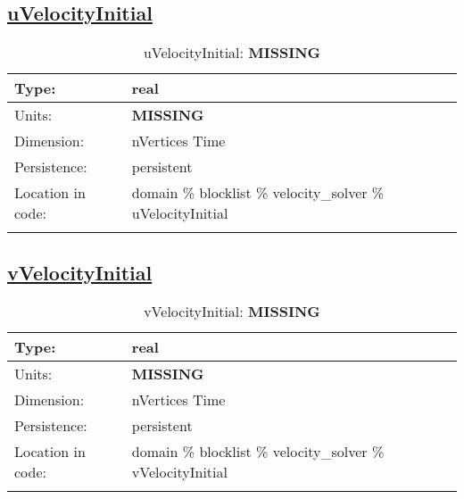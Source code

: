 \subsection[uVelocityInitial]{\hyperref[sec:var_tab_velocity_solver]{uVelocityInitial}}
\label{subsec:var_sec_velocity_solver_uVelocityInitial}
\begin{center}
\begin{longtable}{| p{2.0in} | p{4.0in} |}
        \hline 
        Type: & real \\
        \hline 
        Units: & {\bf \color{red} MISSING} \\
        \hline 
        Dimension: & nVertices Time \\
        \hline 
        Persistence: & persistent \\
        \hline 
         Location in code: & domain \% blocklist \% velocity\_solver \% uVelocityInitial \\
         \hline 
    \caption{uVelocityInitial: {\bf \color{red} MISSING}}
\end{longtable}
\end{center}
\subsection[vVelocityInitial]{\hyperref[sec:var_tab_velocity_solver]{vVelocityInitial}}
\label{subsec:var_sec_velocity_solver_vVelocityInitial}
\begin{center}
\begin{longtable}{| p{2.0in} | p{4.0in} |}
        \hline 
        Type: & real \\
        \hline 
        Units: & {\bf \color{red} MISSING} \\
        \hline 
        Dimension: & nVertices Time \\
        \hline 
        Persistence: & persistent \\
        \hline 
         Location in code: & domain \% blocklist \% velocity\_solver \% vVelocityInitial \\
         \hline 
    \caption{vVelocityInitial: {\bf \color{red} MISSING}}
\end{longtable}
\end{center}

